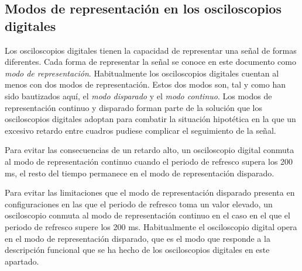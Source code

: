 \subsection{Modos de representación en los osciloscopios digitales}\label{subsec:repmodes}


Los osciloscopios digitales tienen la capacidad de representar una señal de
formas diferentes. Cada forma de representar la señal se conoce en este
documento como \emph{modo de representación}. Habitualmente los
osciloscopios digitales cuentan al menos con dos modos de representación.
Estos dos modos son, tal y como han sido bautizados aquí, el \emph{modo
disparado} y el \emph{modo continuo}. Los modos de representación continuo
y disparado forman parte de la solución que los osciloscopios digitales
adoptan para combatir la situación hipotética en la que un excesivo retardo
entre cuadros pudiese complicar el seguimiento de la señal.

Para evitar las consecuencias de un retardo alto, un osciloscopio digital
conmuta al modo de representación continuo cuando el periodo de refresco
supera los 200 ms, el resto del tiempo permanece en el modo de
representación disparado. %

Para evitar las limitaciones que el modo de representación disparado
presenta en configuraciones en las que el periodo de refresco toma un valor
elevado, un osciloscopio conmuta al modo de representación continuo en el
caso en el que el periodo de refresco supere los 200 ms. Habitualmente el
osciloscopio digital opera en el modo de representación disparado, que es
el modo que responde a la descripción funcional que se ha hecho de los
osciloscopios digitales en este apartado.

